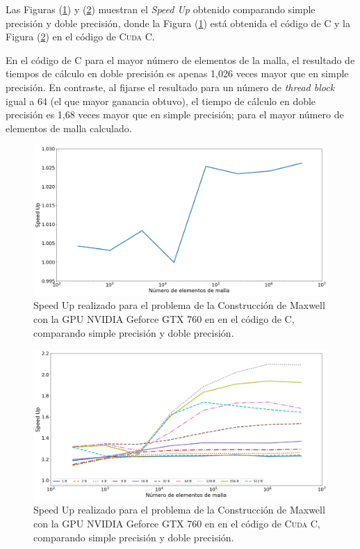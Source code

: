 \newpage

Las Figuras (\ref{fig:c_760_MxC_c_10}) y (\ref{fig:c_760_MxC_cuda_10}) muestran el \textit{Speed Up} obtenido comparando simple precisión y doble precisión, donde la Figura (\ref{fig:c_760_MxC_c_10}) está obtenida el código de \textsc{C} y la Figura (\ref{fig:c_760_MxC_cuda_10}) en el código de \textsc{Cuda C}. 

En el código de \textsc{C} para el mayor número de elementos de la malla, el resultado de tiempos de cálculo en doble precisión es apenas 1,026 veces mayor que en  simple precisión. En contraste, al fijarse el resultado para un número de \textit{thread block} igual a 64 (el que mayor ganancia obtuvo), el tiempo de cálculo en doble precisión es 1,68 veces mayor que en simple precisión; para el mayor número de elementos de malla calculado.

\begin{figure}[htbp]
	\centering
	\includegraphics[width=\textwidth]{figs/cap4/c_760_MxC_c_10}
	\caption{Speed Up realizado para el problema de la Construcción de Maxwell con la GPU NVIDIA Geforce GTX 760 en en el código de \textsc{C}, comparando simple precisión y doble precisión.} 
	\label{fig:c_760_MxC_c_10}	
\end{figure}

\begin{figure}[htbp]
	\centering
	\includegraphics[width=\textwidth]{figs/cap4/c_760_MxC_cuda_10}
	\caption{Speed Up realizado para el problema de la Construcción de Maxwell con la GPU NVIDIA Geforce GTX 760 en en el código de \textsc{Cuda C}, comparando simple precisión y doble precisión.} 
	\label{fig:c_760_MxC_cuda_10}	
\end{figure}

